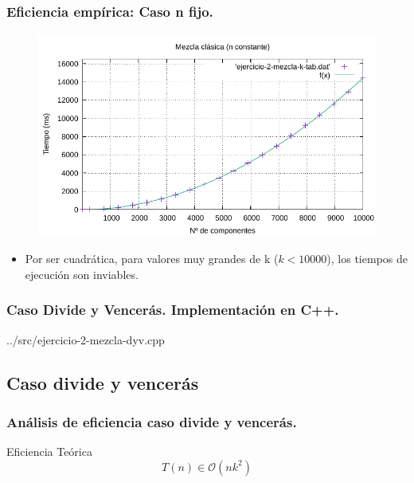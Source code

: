 \documentclass[13pt]{beamer}
\begin{document}
    \begin{frame}
        \frametitle{Eficiencia empírica: Caso n fijo.}

        \begin{figure}
            \centering
            \includegraphics[scale=0.76]{img/e2-obvio-k.pdf}
            \label{fig:2a-obvio-k-graph}
        \end{figure}

        \begin{itemize}
            \item Por ser cuadrática, para valores muy grandes de k ($k < 10000$), los tiempos de ejecución
            son inviables. 
        \end{itemize}
    \end{frame}

    \begin{frame}
		\frametitle{Caso Divide y Vencerás. Implementación en C++.}
		
		{../src/ejercicio-2-mezcla-dyv.cpp} 
	\end{frame}

    \subsection{Caso divide y vencerás}

    \begin{frame}
		\frametitle{Análisis de eficiencia caso divide y vencerás.}
		 \begin{block}{Eficiencia Teórica}
		 	$$T(n) \in \mathcal{O}(nk^{2})$$
		 \end{block}
	 
	\end{frame}
\end{document}
